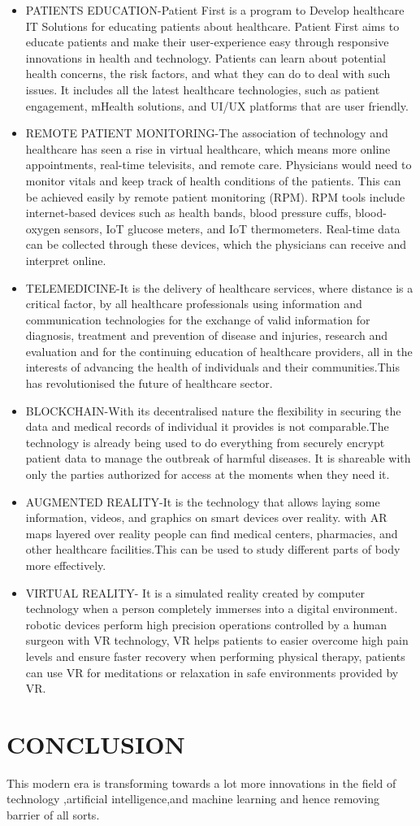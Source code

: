 \documentclass[12pt]{article}
\begin{document}
\begin{itemize}
\item

PATIENTS EDUCATION-Patient First is a program to Develop healthcare IT Solutions for educating patients about healthcare. Patient First aims to educate patients and make their user-experience easy through responsive innovations in health and technology. Patients can learn about potential health concerns, the risk factors, and what they can do to deal with such issues. It includes all the latest healthcare technologies, such as patient engagement, mHealth solutions, and UI/UX platforms that are user friendly.\\
\item
REMOTE PATIENT MONITORING-The association of technology and healthcare has seen a rise in virtual healthcare, which means more online appointments, real-time televisits, and remote care. Physicians would need to monitor vitals and keep track of health conditions of the patients. This can be achieved easily by remote patient monitoring (RPM). RPM tools include internet-based devices such as health bands, blood pressure cuffs, blood-oxygen sensors, IoT glucose meters, and IoT thermometers. Real-time data can be collected through these devices, which the physicians can receive and interpret online.  
\item
TELEMEDICINE-It is the delivery of healthcare services, where distance is a critical factor, by all healthcare professionals using information and communication technologies for the exchange of valid information for diagnosis, treatment and prevention of disease and injuries, research and evaluation and for the continuing education of healthcare providers, all in the interests of advancing the health of individuals and their communities.This has revolutionised the future of healthcare sector.
\item
BLOCKCHAIN-With its decentralised nature the flexibility in securing the data and medical records of individual it provides is not comparable.The technology is already being used to do everything from securely encrypt patient data to manage the outbreak of harmful diseases. It is shareable with only the parties authorized for access at the moments when they need it.
\item
AUGMENTED REALITY-It is the technology that allows laying some information, videos, and graphics on smart devices over reality. with AR maps layered over reality people can find medical centers, pharmacies, and other healthcare facilities.This can be used to study different parts of body more effectively.
\item
VIRTUAL REALITY- It is a simulated reality created by computer technology when a person completely immerses into a digital environment. robotic devices perform high precision operations controlled by a human surgeon with VR technology, VR helps patients to easier overcome high pain levels and ensure faster recovery when performing physical therapy, patients can use VR for meditations or relaxation in safe environments provided by VR.

\end{itemize}
\section{CONCLUSION}
This modern era is transforming towards a lot more innovations in the field of technology ,artificial intelligence,and machine learning and hence removing barrier of all sorts.
\end{document}

